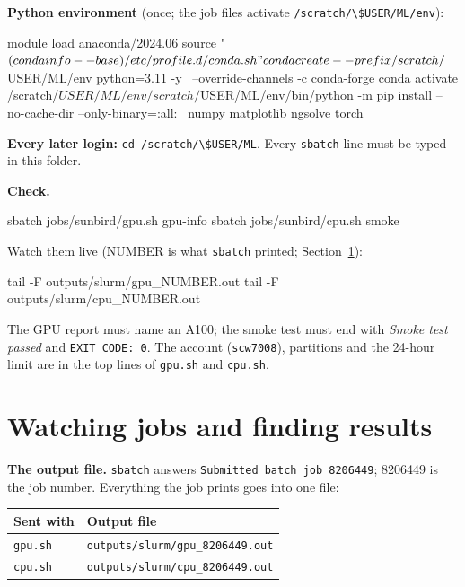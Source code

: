 \documentclass[11pt,a4paper]{article}
\newcommand{\code}[1]{\lstinline{#1}}
\begin{document}
\textbf{Python environment} (once; the job files activate \code{/scratch/\$USER/ML/env}):

\begin{cmd}[Sunbird]
module load anaconda/2024.06
source "$(conda info --base)/etc/profile.d/conda.sh"
conda create --prefix /scratch/$USER/ML/env python=3.11 -y \
             --override-channels -c conda-forge
conda activate /scratch/$USER/ML/env
/scratch/$USER/ML/env/bin/python -m pip install --no-cache-dir --only-binary=:all: \
       numpy matplotlib ngsolve torch
\end{cmd}

\textbf{Every later login:} \code{cd /scratch/\$USER/ML}. Every \code{sbatch} line must be
typed in this folder.

\textbf{Check.}

\begin{cmd}[Sunbird]
sbatch jobs/sunbird/gpu.sh gpu-info
sbatch jobs/sunbird/cpu.sh smoke
\end{cmd}

Watch them live (NUMBER is what \code{sbatch} printed; Section~\ref{sec:watch}):

\begin{cmd}[Sunbird]
tail -F outputs/slurm/gpu_NUMBER.out
tail -F outputs/slurm/cpu_NUMBER.out
\end{cmd}
 The GPU report must name an A100; the smoke test must end with
\emph{Smoke test passed} and \code{EXIT CODE: 0}.
The account (\code{scw7008}), partitions and the 24-hour limit are in the top lines of
\code{gpu.sh} and \code{cpu.sh}.

\section{Watching jobs and finding results}\label{sec:watch}

\textbf{The output file.} \code{sbatch} answers \code{Submitted batch job 8206449}; 8206449 is
the job number. Everything the job prints goes into one file:

\begin{center}
\begin{tabular}{@{}ll@{}}
\toprule
Sent with & Output file \\
\midrule
\code{gpu.sh} & \code{outputs/slurm/gpu_8206449.out} \\
\code{cpu.sh} & \code{outputs/slurm/cpu_8206449.out} \\
\bottomrule
\end{tabular}
\end{center}
\end{document}

